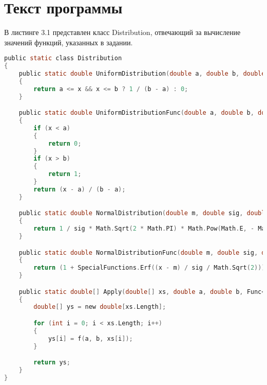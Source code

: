 \chapter{Текст программы}
\label{cha:design}


В листинге 3.1 представлен класс Distribution, отвечающий за вычисление 
значений функций, указанных в задании.

\begin{lstlisting}[caption={Class Distribution},captionpos=t, language=c]
public static class Distribution
{
	public static double UniformDistribution(double a, double b, double x)
	{
		return a <= x && x <= b ? 1 / (b - a) : 0;
	}

	public static double UniformDistributionFunc(double a, double b, double x)
	{
		if (x < a)
		{
			return 0;
		}
		if (x > b)
		{
			return 1;
		}
		return (x - a) / (b - a);
	}

	public static double NormalDistribution(double m, double sig, double x)
	{
		return 1 / sig * Math.Sqrt(2 * Math.PI) * Math.Pow(Math.E, - Math.Pow(x - m, 2) / (2 * sig * sig));
	}

	public static double NormalDistributionFunc(double m, double sig, double x)
	{
		return (1 + SpecialFunctions.Erf((x - m) / sig / Math.Sqrt(2))) / 2;
	}

	public static double[] Apply(double[] xs, double a, double b, Func<double, double, double, double> f)
	{
		double[] ys = new double[xs.Length];

		for (int i = 0; i < xs.Length; i++)
		{
			ys[i] = f(a, b, xs[i]);
		}

		return ys;
	}
}
\end{lstlisting}
